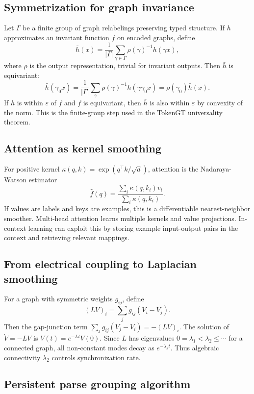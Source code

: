 \documentclass[11pt]{article}
\newcommand{\1}{\mathbf{1}}
\newcommand{\eps}{\varepsilon}
\begin{document}
\subsection{Symmetrization for graph invariance}

Let $\Gamma$ be a finite group of graph relabelings preserving typed structure. If $h$ approximates an invariant function $f$ on encoded graphs, define
\[
\bar h(x)=\frac1{|\Gamma|}\sum_{\gamma\in\Gamma} \rho(\gamma)^{-1}h(\gamma x),
\]
where $\rho$ is the output representation, trivial for invariant outputs. Then $\bar h$ is equivariant:
\[
\bar h(\gamma_0 x)=\frac1{|\Gamma|}\sum_{\gamma}\rho(\gamma)^{-1}h(\gamma\gamma_0 x)
=\rho(\gamma_0)\bar h(x).
\]
If $h$ is within $\eps$ of $f$ and $f$ is equivariant, then $\bar h$ is also within $\eps$ by convexity of the norm. This is the finite-group step used in the TokenGT universality theorem.

\subsection{Attention as kernel smoothing}

For positive kernel $\kappa(q,k)=\exp(q^\top k/\sqrt d)$, attention is the Nadaraya-Watson estimator
\[
\hat f(q)=\frac{\sum_i \kappa(q,k_i)v_i}{\sum_i \kappa(q,k_i)}.
\]
If values are labels and keys are examples, this is a differentiable nearest-neighbor smoother. Multi-head attention learns multiple kernels and value projections. In-context learning can exploit this by storing example input-output pairs in the context and retrieving relevant mappings.

\subsection{From electrical coupling to Laplacian smoothing}

For a graph with symmetric weights $g_{ij}$, define
\[
(LV)_i=\sum_j g_{ij}(V_i-V_j).
\]
Then the gap-junction term $\sum_jg_{ij}(V_j-V_i)=-(LV)_i$. The solution of $\dot V=-LV$ is $V(t)=e^{-Lt}V(0)$. Since $L$ has eigenvalues $0=\lambda_1<\lambda_2\le\cdots$ for a connected graph, all non-constant modes decay as $e^{-\lambda_k t}$. Thus algebraic connectivity $\lambda_2$ controls synchronization rate.

\subsection{Persistent parse grouping algorithm}
\end{document}
